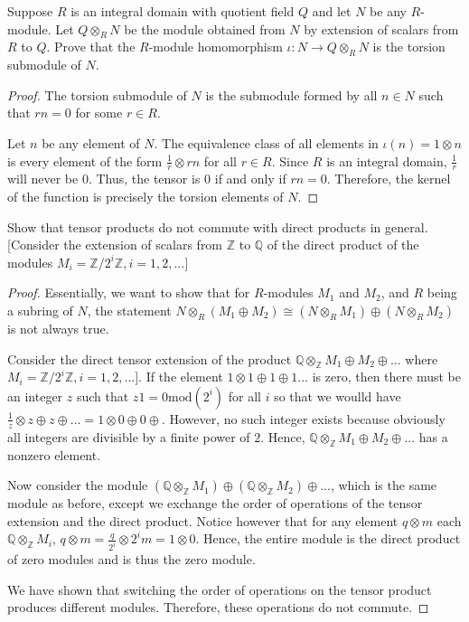 \documentclass[10pt]{article}
\newcommand{\Z}{\mathbb{Z}}
\newcommand{\Q}{\mathbb{Q}}
\newenvironment{problem}[2][Problem]{\begin{trivlist}
		\item[\hskip \labelsep {\bfseries #1}\hskip \labelsep {\bfseries #2.}]}{\end{trivlist}}
\begin{document}
	\begin{problem}{4.9}
		Suppose $R$ is an integral domain with quotient field $Q$ and let $N$ be any $R$-module. Let $Q \otimes_R N$ be the module obtained from $N$ by extension of scalars from $R$ to $Q$. Prove that the $R$-module homomorphism $\iota : N \rightarrow Q \otimes_R N$ is the torsion submodule of $N$.
		\begin{proof}
			The torsion submodule of $N$ is the submodule formed by all $n \in N$ such that $rn =0$ for some $r \in R$.
			
			Let $n$ be any element of $N$. The equivalence class of all elements in $\iota(n) = 1 \otimes n$ is every element of the form $\frac{1}{r} \otimes rn$ for all $r \in R$. Since $R$ is an integral domain, $\frac{1}{r}$ will never be $0$. Thus, the tensor is $0$ if and only if $rn =0$. Therefore, the kernel of the function is precisely the torsion elements of $N$.
		\end{proof}
	\end{problem}
	
	\begin{problem}{4.11}
		
	\end{problem}
	
	\begin{problem}{4.15}
		Show that tensor products do not commute with direct products in general. [Consider
		the extension of scalars from $\Z$ to $\Q$ of the direct product of the modules $M_i = \Z/2^i\Z, i=1,2,...]$
		\begin{proof}
			Essentially, we want to show that for $R$-modules $M_1$ and $M_2$, and $R$ being a subring of $N$, the statement $N \otimes_R (M_1 \oplus M_2) \cong (N \otimes_R M_1) \oplus (N \otimes_R M_2)$ is not always true.
			
			Consider the direct tensor extension of the product $\Q \otimes_\Z M_1 \oplus M_2 \oplus ...$ where $M_i = \Z/2^i\Z, i=1,2,...]$. If the element $1 \otimes 1 \oplus 1 \oplus 1...$ is zero, then there must be an integer $z$ such that $z1 = 0 \text{mod}(2^i)$ for all $i$ so that we woulld have $\frac{1}{z} \otimes z \oplus z \oplus ... = 1 \otimes 0 \oplus 0 \oplus$. However, no such integer exists because obviously all integers are divisible by a finite power of $2$. Hence, $\Q \otimes_\Z M_1 \oplus M_2 \oplus ...$ has a nonzero element.
			
			Now consider the module $(\Q \otimes_\Z M_1) \oplus (\Q \otimes_\Z M_2) \oplus ...$, which is the same module as before, except we exchange the order of operations of the tensor extension and the direct product. Notice however that for any element $q \otimes m$ each $\Q \otimes_\Z M_i$, $q \otimes m = \frac{q}{2^i} \otimes 2^im = 1 \otimes 0$. Hence, the entire module is the direct product of zero modules and is thus the zero module.
			
			We have shown that switching the order of operations on the tensor product produces different modules. Therefore, these operations do not commute.
		\end{proof}
	\end{problem}
	
\end{document}
